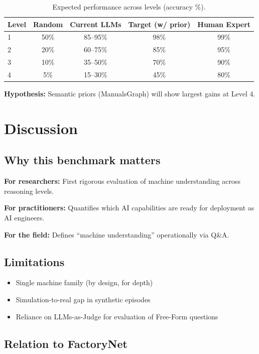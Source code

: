 \documentclass{article}
\begin{document}
\begin{table}[t]
\centering
\caption{Expected performance across levels (accuracy \%).}
\label{tab:results}
\begin{tabular}{@{}lcccc@{}}
\toprule
Level & Random & Current LLMs & Target (w/ prior) & Human Expert \\
\midrule
1 & 50\% & 85--95\% & 98\% & 99\% \\
2 & 20\% & 60--75\% & 85\% & 95\% \\
3 & 10\% & 35--50\% & 70\% & 90\% \\
4 & 5\% & 15--30\% & 45\% & 80\% \\
\bottomrule
\end{tabular}
\end{table}

\textbf{Hypothesis:} Semantic priors (ManualsGraph) will show largest gains at Level 4.

\section{Discussion}

\subsection{Why this benchmark matters}

\textbf{For researchers:} First rigorous evaluation of machine understanding across reasoning levels.

\textbf{For practitioners:} Quantifies which AI capabilities are ready for deployment as AI engineers.

\textbf{For the field:} Defines ``machine understanding'' operationally via Q\&A.

\subsection{Limitations}

\begin{itemize}
    \item Single machine family (by design, for depth)
    \item Simulation-to-real gap in synthetic episodes
    \item Reliance on LLMs-as-Judge for evaluation of Free-Form questions
\end{itemize}

\subsection{Relation to FactoryNet}
\end{document}
